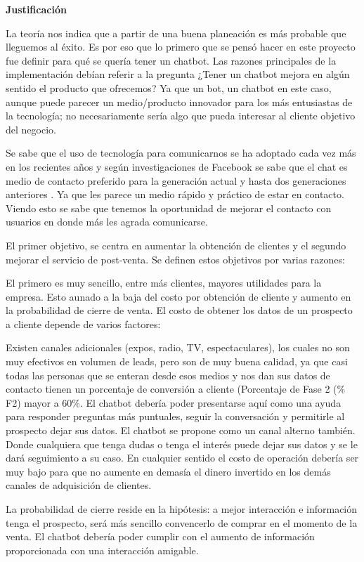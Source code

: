 \textbf{Justificación}

La teoría nos indica que a partir de una buena planeación es más probable que lleguemos al éxito. Es por eso que lo primero que se pensó hacer en este proyecto fue definir para qué se quería tener un chatbot. Las razones principales de la implementación debían referir a la pregunta ¿Tener un chatbot mejora en algún sentido el producto que ofrecemos? Ya que un bot, un chatbot en este caso, aunque puede parecer un medio/producto innovador para los más entusiastas de la tecnología; no necesariamente sería algo que pueda interesar al cliente objetivo del negocio.


Se sabe que el uso de tecnología para comunicarnos se ha adoptado cada vez más en los recientes años y según investigaciones de Facebook se sabe que el chat es medio de contacto preferido para la generación actual y hasta dos generaciones anteriores \cite{moremessage2016}. Ya que les parece un medio rápido y práctico de estar en contacto. Viendo esto se sabe que tenemos la oportunidad de mejorar el contacto con usuarios en donde más les agrada comunicarse.

El primer objetivo, se centra en aumentar la obtención de clientes y el segundo mejorar el servicio de post-venta. Se definen estos objetivos por varias razones:

El primero es muy sencillo, entre más clientes, mayores utilidades para la empresa. Esto aunado a la baja del costo por obtención de cliente y aumento en la probabilidad de cierre de venta. El costo de obtener los datos de un prospecto a cliente depende de varios factores:


Existen canales adicionales (expos, radio, TV, espectaculares), los cuales no son muy efectivos en volumen de leads\cite{wiki:leadgen2018}, pero son de muy buena calidad, ya que casi todas las personas que se enteran desde esos medios y nos dan sus datos de contacto tienen un porcentaje de conversión a cliente (Porcentaje de Fase 2 (\% F2) mayor a 60\%. El chatbot debería poder presentarse aquí como una ayuda para responder preguntas más puntuales, seguir la conversación y permitirle al prospecto dejar sus datos.
El chatbot se propone como un canal alterno también. Donde cualquiera que tenga dudas o tenga el interés puede dejar sus datos y se le dará seguimiento a su caso. En cualquier sentido el costo de operación debería ser muy bajo para que no aumente en demasía el dinero invertido en los demás canales de adquisición de clientes.

La probabilidad de cierre reside en la hipótesis: a mejor interacción e información tenga el prospecto, será más sencillo convencerlo de comprar en el momento de la venta. El chatbot debería poder cumplir con el aumento de información proporcionada con una interacción amigable.

